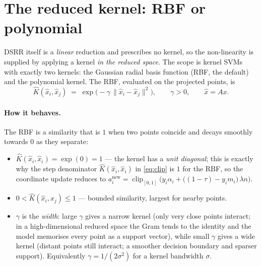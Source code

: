 \documentclass[11pt]{article}
\DeclareMathOperator{\clip}{clip}
\begin{document}
\section{The reduced kernel: RBF or polynomial}\label{sec:kernel}

DSRR itself is a \emph{linear} reduction and prescribes no kernel, so the
non-linearity is supplied by applying a kernel \emph{in the reduced space}. The
scope is kernel SVMs with exactly two kernels: the Gaussian radial basis function
(RBF, the default) and the polynomial kernel. The RBF, evaluated on the projected
points, is
\begin{equation}\label{eq:rbf}
  \hat K(\hat x_i,\hat x_j)
  \;=\; \exp\!\big(-\gamma\,\|\hat x_i-\hat x_j\|^2\big),
  \qquad \gamma>0,\qquad \hat x=Ax .
\end{equation}

\paragraph{How it behaves.} The RBF is a similarity that is $1$ when two points
coincide and decays smoothly towards $0$ as they separate:
\begin{itemize}
  \item $\hat K(\hat x_i,\hat x_i)=\exp(0)=1$ — the kernel has a \emph{unit diagonal};
    this is exactly why the step denominator $\hat K(\hat x_i,\hat x_i)$ in
    \eqref{eq:clip} is $1$ for the RBF, so the coordinate update reduces to
    $a_i^{\text{new}}=\clip_{[0,1]}\!\big(y_i\alpha_i+\big((1-\tau)-y_i m_i\big)\,\lambda n\big)$.
  \item $0<\hat K(\hat x_i,\hat x_j)\le 1$ — bounded similarity, largest for nearby
    points.
  \item $\gamma$ is the \emph{width}: large $\gamma$ gives a narrow kernel (only very
    close points interact; in a high-dimensional reduced space the Gram tends to the
    identity and the model memorises every point as a support vector), while small
    $\gamma$ gives a wide kernel (distant points still interact; a smoother decision
    boundary and sparser support). Equivalently $\gamma=1/(2\sigma^2)$ for a kernel
    bandwidth $\sigma$.
\end{itemize}
\end{document}

